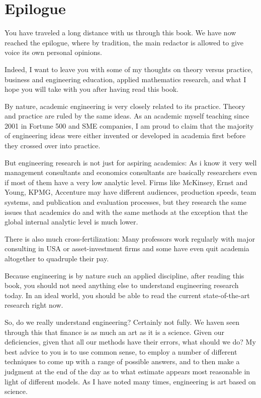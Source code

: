 \documentclass[12pt,a4paper,twoside,openright]{report}
\newcounter{def}
\theoremstyle{definition}
\theoremstyle{itexmp}
\numberwithin{equation}{section}
\begin{document}
	
	
 	\chapter{Epilogue}
	You have traveled a long distance with us through this book. We have now reached the epilogue, where by tradition, the main redactor is allowed to give voice its own personal opinions. 

	Indeed, I want to leave you with some of my thoughts on theory versus practice, business and engineering education, applied mathematics research, and what I hope you will take with you after having read this book.
	
	By nature, academic engineering is very closely related to its practice. Theory and practice are ruled by the same ideas. As an academic myself teaching since 2001 in Fortune 500 and SME companies, I am proud to claim that the majority of engineering ideas were either invented or developed in academia first before they crossed over into practice.
	
	But engineering research is not just for aspiring academics: As i know it very well management consultants and economics consultants are basically researchers even if most of them have a very low analytic level. Firms like McKinsey, Ernst and Young, KPMG, Accenture may have different audiences, production speeds, team systems, and publication and evaluation processes, but they research the same issues that academics do and with the same methods at the exception that the global internal analytic level is much lower.

	There is also much cross-fertilization: Many professors work regularly with major consulting in USA or asset-investment firms and some have even quit academia altogether to quadruple their pay.

	Because engineering is by nature such an applied discipline, after reading this book,  you should not need anything else to understand engineering research today. In an ideal world, you should be able to read the current state-of-the-art research right now.
	
	So, do we really understand engineering? Certainly not fully. We haven seen through this that finance is as much an art as it is a science. Given our deficiencies, given that all our methods have their errors, what should we do? My best advice to you is to use common sense, to employ a number of different techniques to come up with a range of possible answers, and to then make a judgment at the end of the day as to what estimate appears most reasonable in light of different models. As I have noted many times, engineering is art based on science.
	
\end{document}
